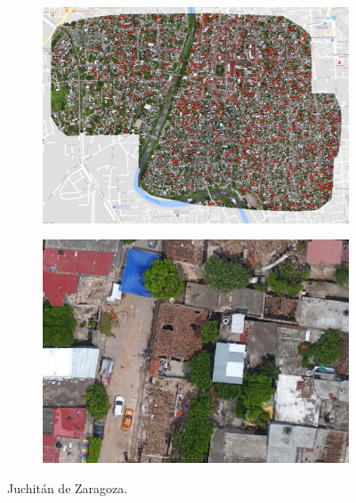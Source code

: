 \begin{figure}[!h]
  \centering
    \begin{subfigure}{.9\textwidth}
        \includegraphics[width=\textwidth]{images/juchitan-ortho.jpg}
    \end{subfigure}
    \begin{subfigure}{.9\textwidth}
        \includegraphics[width=\textwidth]{images/juchitan-example.jpg}
    \end{subfigure}
  \caption{Juchit\'an de Zaragoza.}
  \label{fig:juchitan-gis}
\end{figure}

